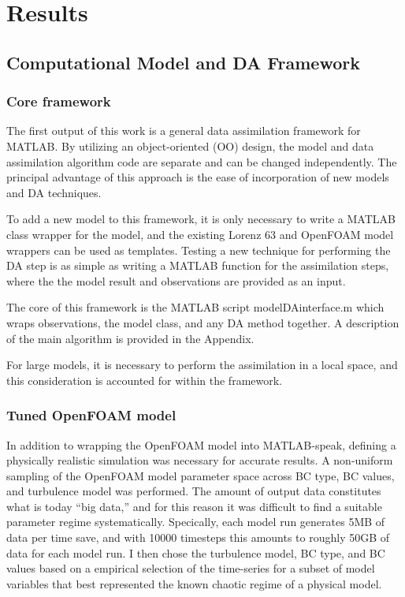 \chapter{Results}
\chaptermark{} %

\section{Computational Model and DA Framework}

\subsection{Core framework}

The first output of this work is a general data assimilation framework for MATLAB.
By utilizing an object-oriented (OO) design, the model and data assimilation algorithm code are separate and can be changed independently.
The principal advantage of this approach is the ease of incorporation of new models and DA techniques.

To add a new model to this framework, it is only necessary to write a MATLAB class wrapper for the model, and the existing Lorenz 63 and OpenFOAM model wrappers can be used as templates.
Testing a new technique for performing the DA step is as simple as writing a MATLAB function for the assimilation steps, where the the model result and observations are provided as an input.

The core of this framework is the MATLAB script modelDAinterface.m which wraps observations, the model class, and any DA method together.
A description of the main algorithm is provided in the Appendix.

For large models, it is necessary to perform the assimilation in a local space, and this consideration is accounted for within the framework.

\subsection{Tuned OpenFOAM model}

In addition to wrapping the OpenFOAM model into MATLAB-speak, defining a physically realistic simulation was necessary for accurate results.
A non-uniform sampling of the OpenFOAM model parameter space across BC type, BC values, and turbulence model was performed.
The amount of output data constitutes what is today ``big data,'' and for this reason it was difficult to find a suitable parameter regime systematically.
Specically, each model run generates 5MB of data per time save, and with 10000 timesteps this amounts to roughly 50GB of data for each model run.
I then chose the turbulence model, BC type, and BC values based on a empirical selection of the time-series for a subset of model variables that best represented the known chaotic regime of a physical model.


